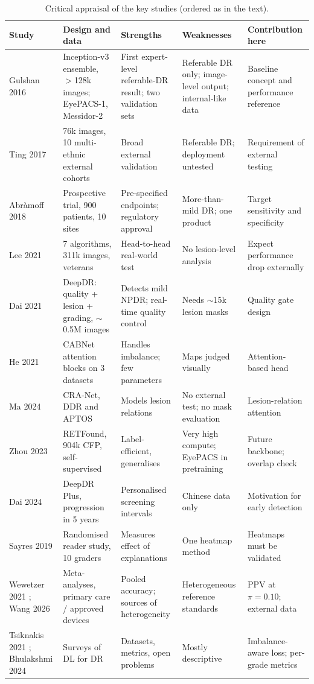 \begin{table}[t]
\centering\scriptsize
\caption{Critical appraisal of the key studies (ordered as in the text).}\label{tab:lr}
\begin{tabular}{@{}p{1.9cm}p{3.4cm}p{3.4cm}p{3.4cm}p{2.9cm}@{}}
\toprule
Study & Design and data & Strengths & Weaknesses & Contribution here\\\midrule
Gulshan 2016 \cite{gulshan2016} & Inception-v3 ensemble, $>$128k images; EyePACS-1, Messidor-2 & First expert-level referable-DR result; two validation sets & Referable DR only; image-level output; internal-like data & Baseline concept and performance reference\\
Ting 2017 \cite{ting2017} & 76k images, 10 multi-ethnic external cohorts & Broad external validation & Referable DR; deployment untested & Requirement of external testing\\
Abr\`amoff 2018 \cite{abramoff2018} & Prospective trial, 900 patients, 10 sites & Pre-specified endpoints; regulatory approval & More-than-mild DR; one product & Target sensitivity and specificity\\
Lee 2021 \cite{lee2021} & 7 algorithms, 311k images, veterans & Head-to-head real-world test & No lesion-level analysis & Expect performance drop externally\\
Dai 2021 \cite{dai2021} & DeepDR: quality + lesion + grading, $\sim$0.5M images & Detects mild NPDR; real-time quality control & Needs $\sim$15k lesion masks & Quality gate design\\
He 2021 \cite{he2021} & CABNet attention blocks on 3 datasets & Handles imbalance; few parameters & Maps judged visually & Attention-based head\\
Ma 2024 \cite{ma2024} & CRA-Net, DDR and APTOS & Models lesion relations & No external test; no mask evaluation & Lesion-relation attention\\
Zhou 2023 \cite{zhou2023} & RETFound, 904k CFP, self-supervised & Label-efficient, generalises & Very high compute; EyePACS in pretraining & Future backbone; overlap check\\
Dai 2024 \cite{dai2024} & DeepDR Plus, progression in 5 years & Personalised screening intervals & Chinese data only & Motivation for early detection\\
Sayres 2019 \cite{sayres2019} & Randomised reader study, 10 graders & Measures effect of explanations & One heatmap method & Heatmaps must be validated\\
Wewetzer 2021 \cite{wewetzer2021}; Wang 2026 \cite{wang2026} & Meta-analyses, primary care / approved devices & Pooled accuracy; sources of heterogeneity & Heterogeneous reference standards & PPV at $\pi=0.10$; external data\\
Tsiknakis 2021 \cite{tsiknakis2021}; Bhulakshmi 2024 \cite{bhulakshmi2024} & Surveys of DL for DR & Datasets, metrics, open problems & Mostly descriptive & Imbalance-aware loss; per-grade metrics\\
\bottomrule
\end{tabular}
\end{table}

